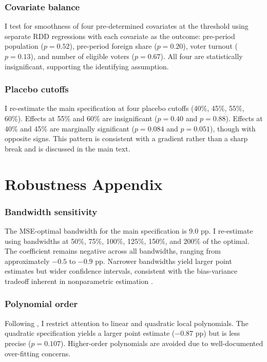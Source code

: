 \documentclass[12pt]{article}
\begin{document}
\subsubsection*{Covariate balance} I test for smoothness of four pre-determined covariates at the threshold using separate RDD regressions with each covariate as the outcome: pre-period population ($p = 0.52$), pre-period foreign share ($p = 0.20$), voter turnout ($p = 0.13$), and number of eligible voters ($p = 0.67$). All four are statistically insignificant, supporting the identifying assumption.

\subsubsection*{Placebo cutoffs} I re-estimate the main specification at four placebo cutoffs (40\%, 45\%, 55\%, 60\%). Effects at 55\% and 60\% are insignificant ($p = 0.40$ and $p = 0.88$). Effects at 40\% and 45\% are marginally significant ($p = 0.084$ and $p = 0.051$), though with opposite signs. This pattern is consistent with a gradient rather than a sharp break and is discussed in the main text.


\section{Robustness Appendix}
\label{sec:robust_appendix}

\subsubsection*{Bandwidth sensitivity} The MSE-optimal bandwidth for the main specification is 9.0 pp. I re-estimate using bandwidths at 50\%, 75\%, 100\%, 125\%, 150\%, and 200\% of the optimal. The coefficient remains negative across all bandwidths, ranging from approximately $-0.5$ to $-0.9$ pp. Narrower bandwidths yield larger point estimates but wider confidence intervals, consistent with the bias-variance tradeoff inherent in nonparametric estimation \citep{imbens2012}.

\subsubsection*{Polynomial order} Following \citet{gelman2019}, I restrict attention to linear and quadratic local polynomials. The quadratic specification yields a larger point estimate ($-0.87$ pp) but is less precise ($p = 0.107$). Higher-order polynomials are avoided due to well-documented over-fitting concerns.
\end{document}
